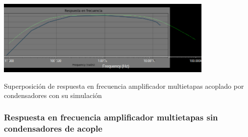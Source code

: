 \begin{ilustracion}[ht]
    \centering
    \includegraphics[width=0.8\textwidth]{src/images/resultados/p4/superposicion respuesta en frecuencia con condensadores.png}
    \caption{Superposición de respuesta en frecuencia amplificador multietapas acoplado por condensadores con su simulación}
    \label{ilus:superposicion-respuesta-frecuencia-amplificador-multietapas-acoplado-condensadores}
\end{ilustracion}

\FloatBarrier
\subsubsection{Respuesta en frecuencia amplificador multietapas sin condensadores de acople}

